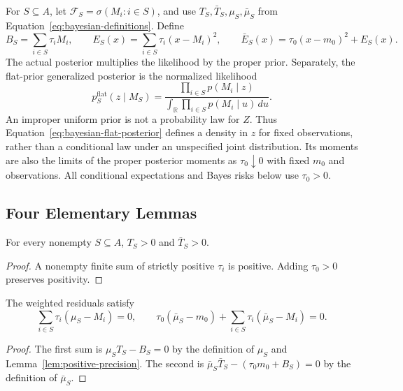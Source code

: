 For $S\subseteq A$, let $\mathcal{F}_S=\sigma(M_i:i\in S)$, and use $T_S,\bar T_S,\mu_S,\bar\mu_S$ from Equation~\eqref{eq:bayesian-definitions}. Define
\begin{equation}\label{eq:bayesian-energy}
B_S=\sum_{i\in S}\tau_i M_i,\qquad
E_S(x)=\sum_{i\in S}\tau_i(x-M_i)^2,\qquad
\bar E_S(x)=\tau_0(x-m_0)^2+E_S(x).
\end{equation}
The actual posterior multiplies the likelihood by the proper prior. Separately, the flat-prior generalized posterior is the normalized likelihood
\begin{equation}\label{eq:bayesian-flat-posterior}
p_S^{\mathrm{flat}}(z\mid M_S)
=\frac{\prod_{i\in S}p(M_i\mid z)}
{\int_{\mathbb{R}}\prod_{i\in S}p(M_i\mid u)\,du}.
\end{equation}
An improper uniform prior is not a probability law for $Z$. Thus Equation~\eqref{eq:bayesian-flat-posterior} defines a density in $z$ for fixed observations, rather than a conditional law under an unspecified joint distribution. Its moments are also the limits of the proper posterior moments as $\tau_0\downarrow0$ with fixed $m_0$ and observations. All conditional expectations and Bayes risks below use $\tau_0>0$.

\subsection{Four Elementary Lemmas}

\begin{mosaiclemma}\label{lem:positive-precision}
For every nonempty $S\subseteq A$, $T_S>0$ and $\bar T_S>0$.
\end{mosaiclemma}
\begin{proof}
A nonempty finite sum of strictly positive $\tau_i$ is positive. Adding $\tau_0>0$ preserves positivity.
\end{proof}

\begin{mosaiclemma}[Centering]\label{lem:bayesian-centering}
The weighted residuals satisfy
\begin{equation}
\sum_{i\in S}\tau_i(\mu_S-M_i)=0,\qquad
\tau_0(\bar\mu_S-m_0)+\sum_{i\in S}\tau_i(\bar\mu_S-M_i)=0.
\end{equation}
\end{mosaiclemma}
\begin{proof}
The first sum is $\mu_ST_S-B_S=0$ by the definition of $\mu_S$ and Lemma~\ref{lem:positive-precision}. The second is $\bar\mu_S\bar T_S-(\tau_0m_0+B_S)=0$ by the definition of $\bar\mu_S$.
\end{proof}

